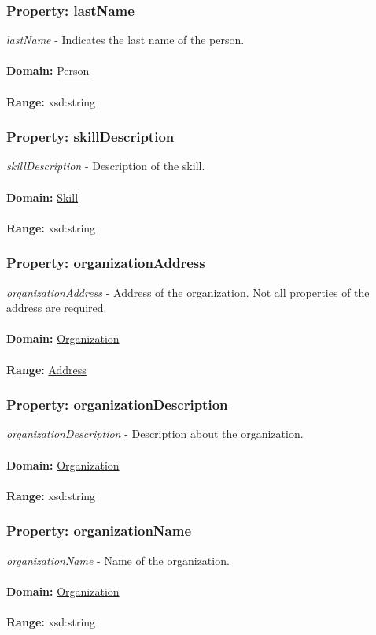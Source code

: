 \documentclass[a4paper,12pt]{article}
\numberwithin{equation}{section}
\begin{document}
\subsubsection{Property: lastName}\hypertarget{lastName}{}
\textit{lastName} - Indicates the last name of the person.
\\\\
\textbf{Domain:} \hyperlink{Person}{Person} 
\\\\
\textbf{Range:}   xsd:string

\subsubsection{Property: skillDescription}\hypertarget{skillDescription}{}
\textit{skillDescription} - Description of the skill.
\\\\
\textbf{Domain:} \hyperlink{Skill}{Skill} 
\\\\
\textbf{Range:}   xsd:string

\subsubsection{Property: organizationAddress}\hypertarget{organizationAddress}{}
\textit{organizationAddress} - Address of the organization. Not all properties of the address are required.
\\\\
\textbf{Domain:} \hyperlink{Organization}{Organization} 
\\\\
\textbf{Range:}   \hyperlink{Address}{Address} 

\subsubsection{Property: organizationDescription}\hypertarget{organizationDescription}{}
\textit{organizationDescription} - Description about the organization.
\\\\
\textbf{Domain:} \hyperlink{Organization}{Organization} 
\\\\
\textbf{Range:}   xsd:string

\subsubsection{Property: organizationName}\hypertarget{organizationName}{}
\textit{organizationName} - Name of the organization.
\\\\
\textbf{Domain:} \hyperlink{Organization}{Organization} 
\\\\
\textbf{Range:}   xsd:string
\end{document}

